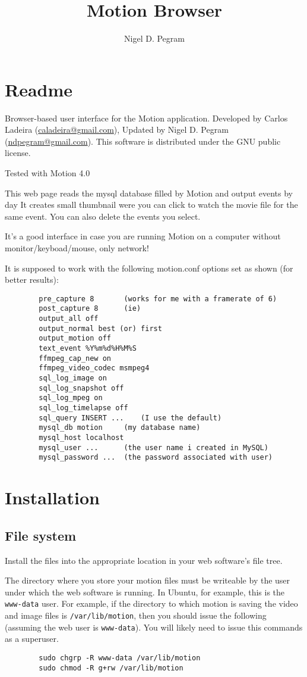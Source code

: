 \documentclass[12pt]{scrartcl} %
\title{Motion Browser}
\author{Nigel D. Pegram}
\begin{document}
\maketitle
\tableofcontents

\section{Readme}
	Browser-based user interface for the Motion application.
	Developed by Carlos Ladeira (\href{mailto:caladeira@gmail.com}{caladeira@gmail.com}),
	Updated by Nigel D. Pegram (\href{mailto:ndpegram@gmail.com}{ndpegram@gmail.com}).
	This software is distributed under the GNU public license.

	Tested with Motion 4.0

	This web page reads the mysql database filled by Motion and
	output events by day 	It creates small thumbnail were you can click to watch the movie
	file for the same event. You can also delete the events you select.

	It's a good interface in case you are running Motion on a computer
	without monitor/keyboad/mouse, only network!

	It is supposed to work with the following motion.conf
	options set as shown (for better results):

	\begin{verbatim}
		pre_capture 8		(works for me with a framerate of 6)
		post_capture 8		(ie)
		output_all off
		output_normal best (or) first
		output_motion off
		text_event %Y%m%d%H%M%S
		ffmpeg_cap_new on
		ffmpeg_video_codec msmpeg4
		sql_log_image on
		sql_log_snapshot off
		sql_log_mpeg on
		sql_log_timelapse off
		sql_query INSERT ...	(I use the default)
		mysql_db motion		(my database name)
		mysql_host localhost
		mysql_user ...		(the user name i created in MySQL)
		mysql_password ...	(the password associated with user)
	\end{verbatim}

\section{Installation}

	\subsection{File system}
	Install the files into the appropriate location in your web software's file tree.

	The directory where you store your motion files must be writeable by the user under which
	the web software is running. In Ubuntu, for example, this is the \texttt{www-data} user.
	For example, if the directory to which motion is saving the video and image files is \texttt{/var/lib/motion},
	then you should issue the following (assuming the web user is \texttt{www-data}).
	You will likely need to issue this commands as a superuser.
	\begin{verbatim}
		sudo chgrp -R www-data /var/lib/motion
		sudo chmod -R g+rw /var/lib/motion
	\end{verbatim}
\end{document}
